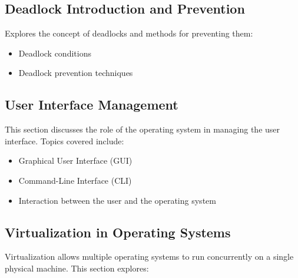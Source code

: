 \documentclass[12pt]{article}
\begin{document}
\subsection{Deadlock Introduction and Prevention}
Explores the concept of deadlocks and methods for preventing them:
\begin{itemize}
    \item Deadlock conditions
    \item Deadlock prevention techniques
\end{itemize}

\subsection{User Interface Management}
This section discusses the role of the operating system in managing the user interface. Topics covered include:
\begin{itemize}
    \item Graphical User Interface (GUI)
    \item Command-Line Interface (CLI)
    \item Interaction between the user and the operating system
\end{itemize}

\subsection{Virtualization in Operating Systems}
Virtualization allows multiple operating systems to run concurrently on a single physical machine. This section explores:
\end{document}

